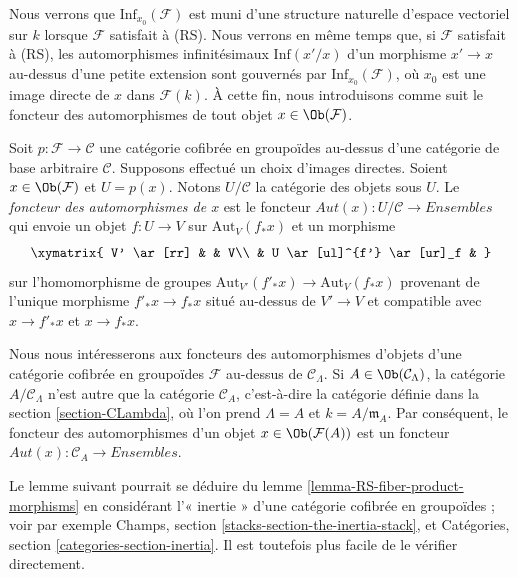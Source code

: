 \noindent
Nous verrons que $\text{Inf}_{x_0}(\mathcal{F})$ est muni d'une structure
naturelle d'espace vectoriel sur $k$ lorsque $\mathcal{F}$ satisfait à (RS).
Nous verrons en même temps que, si $\mathcal{F}$ satisfait à (RS), les
automorphismes infinitésimaux
$\text{Inf}(x'/x)$ d'un morphisme $x' \to x$ au-dessus d'une petite extension
sont gouvernés par $\text{Inf}_{x_0}(\mathcal{F})$, où $x_0$ est une image
directe de $x$ dans $\mathcal{F}(k)$. À cette fin, nous introduisons comme suit
le foncteur des automorphismes de tout objet $x \in \Ob(\mathcal{F})$.

\begin{definition}
\label{definition-automorphism-functor}
Soit $p : \mathcal{F} \to \mathcal{C}$ une catégorie cofibrée en groupoïdes
au-dessus d'une catégorie de base arbitraire $\mathcal{C}$. Supposons effectué
un choix d'images directes. Soient $x \in \Ob(\mathcal{F})$ et $U = p(x)$.
Notons $U/\mathcal{C}$ la catégorie des objets sous $U$. Le {\it foncteur des
automorphismes de $x$} est le foncteur
$\mathit{Aut}(x) : U/\mathcal{C} \to \textit{Ensembles}$ qui envoie un objet
$f : U \to V$ sur $\text{Aut}_V(f_*x)$ et un morphisme
$$
\xymatrix{
V' \ar[rr] &                    & V\\
          & U \ar[ul]^{f'}  \ar[ur]_f &
}
$$
sur l'homomorphisme de groupes
$\text{Aut}_{V'}(f'_*x) \to \text{Aut}_V(f_*x)$
provenant de l'unique morphisme $f'_*x \to f_*x$ situé au-dessus de
$V' \to V$ et compatible avec $x \to f'_*x$ et $x \to f_*x$.
\end{definition}

\noindent
Nous nous intéresserons aux foncteurs des automorphismes d'objets d'une
catégorie cofibrée en groupoïdes $\mathcal{F}$ au-dessus de
$\mathcal{C}_\Lambda$. Si $A \in \Ob(\mathcal{C}_\Lambda)$, la catégorie
$A/\mathcal{C}_\Lambda$ n'est autre que la catégorie $\mathcal{C}_A$,
c'est-à-dire la catégorie définie dans la section \ref{section-CLambda}, où
l'on prend $\Lambda = A$ et $k = A/\mathfrak m_A$. Par conséquent, le foncteur
des automorphismes d'un objet $x \in \Ob(\mathcal{F}(A))$ est un foncteur
$\mathit{Aut}(x) : \mathcal{C}_A \to \textit{Ensembles}$.

\medskip\noindent
Le lemme suivant pourrait se déduire du lemme
\ref{lemma-RS-fiber-product-morphisms} en considérant l'« inertie » d'une
catégorie cofibrée en groupoïdes ; voir par exemple Champs, section
\ref{stacks-section-the-inertia-stack}, et Catégories, section
\ref{categories-section-inertia}. Il est toutefois plus facile de le vérifier
directement.

